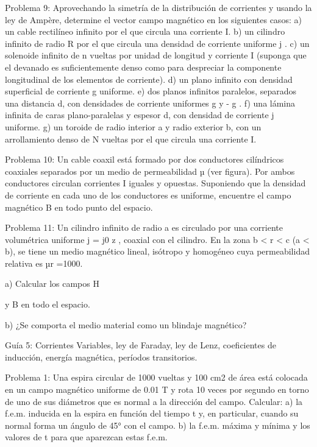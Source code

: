 Problema 9:
Aprovechando la simetría de la distribución de corrientes y usando la ley de Ampère, determine el vector campo magnético en los siguientes casos:
a)	un cable rectilíneo infinito por el que circula una corriente I.
b)	un cilindro infinito de radio R por el que circula una densidad de corriente uniforme  j .
c)	un solenoide infinito de n vueltas por unidad de longitud y corriente I (suponga que el devanado es suficientemente denso como para despreciar la componente longitudinal de los elementos de corriente).
d)	un plano infinito con densidad superficial de corriente g uniforme.
e)	dos  planos  infinitos  paralelos,  separados  una  distancia  d,  con  densidades  de  corriente uniformes g y - g .
f)	una lámina infinita de caras plano-paralelas y espesor d, con densidad de corriente   j
uniforme.
g)	un toroide de radio interior a y radio exterior b, con un arrollamiento denso de N vueltas por el que circula una corriente I.

Problema 10:
Un cable coaxil está formado por dos conductores cilíndricos coaxiales separados por un medio de permeabilidad µ (ver figura). Por ambos conductores circulan corrientes I iguales y opuestas. Suponiendo que la densidad  de corriente en  cada uno  de los  conductores  es  uniforme,
encuentre el campo magnético B en todo punto del espacio.



Problema 11:
Un cilindro infinito de radio a es circulado por una corriente volumétrica uniforme  j  = j0   z , coaxial con el cilindro. En la zona b < r < c (a < b), se tiene un medio magnético lineal,
isótropo y homogéneo cuya permeabilidad relativa es µr =1000.

 
a)	Calcular los campos H
 
y B en todo el espacio.
 
b)	¿Se comporta el medio material como un blindaje magnético?
 


Guía 5: Corrientes Variables, ley de Faraday, ley de Lenz, coeficientes de inducción, energía magnética, períodos transitorios.

Problema 1:
Una espira circular de 1000 vueltas y 100 cm2 de área está colocada en un campo magnético uniforme de 0.01 T y rota 10 veces por segundo en torno de uno de sus diámetros que es normal a la dirección del campo. Calcular:
a)	la f.e.m. inducida en la espira en función del tiempo t y, en particular, cuando su normal forma un ángulo de 45° con el campo.
b)	la f.e.m. máxima y mínima y los valores de t para que aparezcan estas f.e.m.



